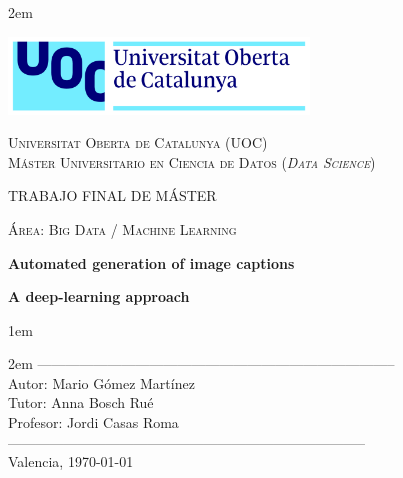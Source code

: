\newpage
\thispagestyle{empty}

\baselineskip 2em


\centerline{\includegraphics[width=0.6\textwidth]{images/UOC-logo}}
\begin{center}
\textsc{Universitat Oberta de Catalunya (UOC) \\
 Máster Universitario en Ciencia de Datos (\textit{Data Science})\\}


\vspace*{1.5cm}

\textsc{\Large TRABAJO FINAL DE MÁSTER}

\vspace*{0.5cm}

\textsc{\large Área: Big Data / Machine Learning}



\vspace*{2.0cm}

\textbf{\Large Automated generation of image captions}

\textbf{\large A deep-learning approach}

\vspace{2.5cm}
\baselineskip 1em

\baselineskip 2em
-----------------------------------------------------------------------------\\
Autor:      Mario Gómez Martínez\\
Tutor:      Anna Bosch Rué\\
Profesor:   Jordi Casas Roma\\
-----------------------------------------------------------------------------\\
\vspace*{1.5cm}
Valencia, \today

\end{center}

\newpage
\pagestyle{empty}
\hfill
